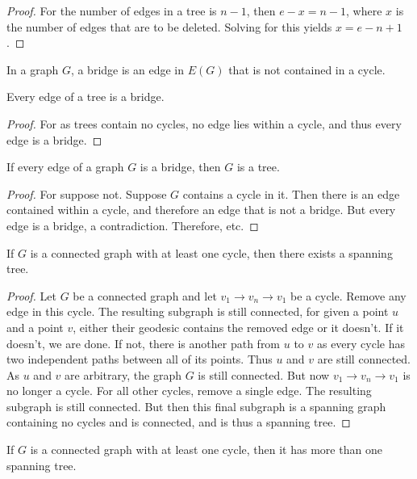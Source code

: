     \begin{proof}
    For the number of edges in a tree is $n-1$, then $e-x = n-1$, where $x$ is the number of edges that are to be deleted. Solving for this yields $x=e-n+1$.
    \end{proof}
    \begin{definition}
    In a graph $G$, a bridge is an edge in $E(G)$ that is not contained in a cycle.
    \end{definition}
    \begin{theorem}
    Every edge of a tree is a bridge.
    \end{theorem}
    \begin{proof}
    For as trees contain no cycles, no edge lies within a cycle, and thus every edge is a bridge.
    \end{proof}
    \begin{theorem}
    If every edge of a graph $G$ is a bridge, then $G$ is a tree.
    \end{theorem}
    \begin{proof}
    For suppose not. Suppose $G$ contains a cycle in it. Then there is an edge contained within a cycle, and therefore an edge that is not a bridge. But every edge is a bridge, a contradiction. Therefore, etc.
    \end{proof}
    \begin{theorem}
    If $G$ is a connected graph with at least one cycle, then there exists a spanning tree.
    \end{theorem}
    \begin{proof}
    Let $G$ be a connected graph and let $v_1 \rightarrow v_n\rightarrow v_1$ be a cycle. Remove any edge in this cycle. The resulting subgraph is still connected, for given a point $u$ and a point $v$, either their geodesic contains the removed edge or it doesn't. If it doesn't, we are done. If not, there is another path from $u$ to $v$ as every cycle has two independent paths between all of its points. Thus $u$ and $v$ are still connected. As $u$ and $v$ are arbitrary, the graph $G$ is still connected. But now $v_1\rightarrow v_n \rightarrow v_1$ is no longer a cycle. For all other cycles, remove a single edge. The resulting subgraph is still connected. But then this final subgraph is a spanning graph containing no cycles and is connected, and is thus a spanning tree.
    \end{proof}
    \begin{theorem}
    If $G$ is a connected graph with at least one cycle, then it has more than one spanning tree.
    \end{theorem}
